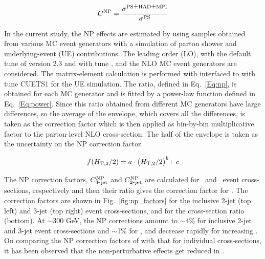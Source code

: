 \begin{equation}
 \label{Eq:np}
 C^{\rm NP} = \frac{\sigma^{\rm PS \plusn HAD \plusn MPI}}{\sigma^{\rm PS}}
\end{equation}

In the current study, the NP effects are estimated by using samples obtained from various MC event generators with a simulation of parton shower and underlying-event (UE) contributions. The leading order (LO), \HERWIGPP with the default tune of version 2.3 and \PYTHIAS with tune \Ztwostar, and the NLO \POWHEG MC event generators are considered. The matrix-element calculation is performed with \POWHEG interfaced to \PYTHIAE with tune CUETS1 for the UE simulation. The ratio, defined in Eq.~\ref{Eq:np}, is obtained for each MC generator and is fitted by a power-law function defined in Eq.~\ref{Eq:power}. Since this ratio obtained from different MC generators have large differences, so the average of the envelope, which covers all the differences, is taken as the correction factor which is then applied as bin-by-bin multiplicative factor to the parton-level NLO cross-section. The half of the envelope is taken as the uncertainty on the NP correction factor. 

\begin{equation}
 \label{Eq:power}
 f(\httwo) = a\cdot\big(\httwo\big)^{b}\plus c
\end{equation}

The NP correction factors, $C_{\rm 3\mbox{-} jet}^{\rm NP}$ and $C_{\rm 2\mbox{-} jet}^{\rm NP}$ are calculated for \njth~and \njt~event cross-sections, respectively and then their ratio gives the correction factor for \ratio . The correction factors are shown in Fig.~\ref{fig:np_factors} for the inclusive 2-jet (top left) and 3-jet (top right) event cross-sections, and for the cross-section ratio \ratio (bottom). At \httwo $\sim$300 GeV, the NP corrections amount to $\sim$4\% for inclusive 2-jet and 3-jet event cross-sections and $\sim$1\% for \ratio, and decrease rapidly for increasing \httwo. On comparing the NP correction factors of \ratio with that for individual cross-sections, it has been observed that the non-perturbative effects get reduced in \ratio.

